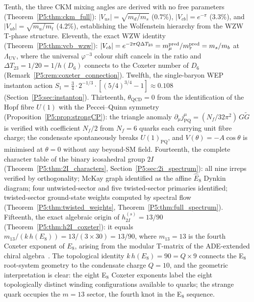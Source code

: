 \documentclass[11pt,a4paper]{article}
\theoremstyle{definition}
\theoremstyle{remark}
\newcommand{\vp}{\varphi}
\newcommand{\LUV}{\Lambda_{\mathrm{UV}}}
\begin{document}
Tenth, the three CKM mixing angles are derived with no free parameters
(Theorem~\ref{P5:thm:ckm_full}): $|V_{us}|=\sqrt{m_d/m_s}$ ($0.7\%$),
$|V_{cb}|=e^{-\pi}$ ($3.3\%$), and $|V_{ub}|=\sqrt{m_u/m_t}$ ($4.2\%$),
establishing the Wolfenstein hierarchy from the WZW T-phase structure.
Eleventh, the exact WZW identity (Theorem~\ref{P5:thm:vcb_wzw}):
$|V_{cb}| = e^{-2\pi Q\Delta T_{23}}
= m_\mu^{\rm pred}/m_\tau^{\rm pred}
= m_s/m_b$ at $\LUV$,
where the universal $\vp^{-3}$ colour shift cancels in the ratio and
$\Delta T_{23}=1/20=1/h(D_6)$ connects to the Coxeter number of $D_6$
(Remark~\ref{P5:rem:coxeter_connection}).
Twelfth, the single-baryon WEP instanton action
$S_1 = \tfrac{3}{4}\cdot2^{-1/3}\cdot[(5/4)^{3/4}-1]\approx0.108$
(Section~\ref{P5:sec:instanton}).
Thirteenth, $\theta_{\mathrm{QCD}}=0$ from the identification of the
Hopf fibre $U(1)$ with the Peccei--Quinn symmetry
(Proposition~\ref{P5:prop:strongCP}): the triangle anomaly
$\partial_\mu j_{\mathrm{PQ}}^\mu = (N_f/32\pi^2)\,G\widetilde{G}$
is verified with coefficient $N_f/2$ from $N_f=6$ quarks each
carrying unit fibre charge; the condensate spontaneously breaks
$U(1)_{\mathrm{PQ}}$, and $V(\theta)=-A\cos\theta$ is minimised at
$\theta=0$ without any beyond-SM field.
Fourteenth, the complete character table of the binary icosahedral group $2I$
(Theorem~\ref{P5:thm:2I_characters}, Section~\ref{P5:sec:2i_spectrum}):
all nine irreps verified by orthogonality; McKay graph identified as
the affine $\hat{E}_8$ Dynkin diagram; four untwisted-sector and five
twisted-sector primaries identified; twisted-sector ground-state weights
computed by spectral flow (Theorem~\ref{P5:thm:twisted_weights},
Theorem~\ref{P5:thm:full_spectrum}).
Fifteenth, the exact algebraic origin of $h_{2I}^{(s)}=13/90$
(Theorem~\ref{P5:thm:h2I_coxeter}): it equals
$m_{13}/(k\,h(E_8)) = 13/(3\times30) = 13/90$,
where $m_{13}=13$ is the fourth Coxeter exponent of $E_8$,
arising from the modular T-matrix of the ADE-extended chiral
algebra~\cite{CIZ1987}.
The topological identity $k\,h(E_8) = 90 = Q\times 9$
connects the E$_8$ root-system geometry to the condensate charge $Q=10$,
and the geometric interpretation is clear: the eight E$_8$ Coxeter
exponents label the eight topologically distinct winding configurations
available to quarks; the strange quark occupies the $m=13$ sector,
the fourth knot in the E$_8$ sequence.
\end{document}
